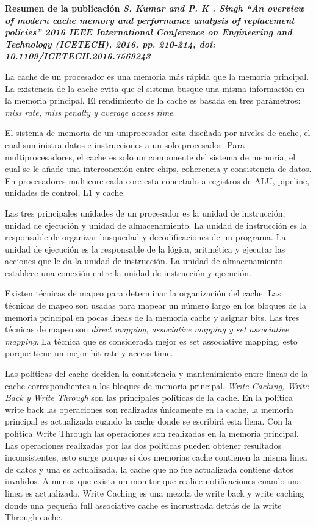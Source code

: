 \item \textbf{Resumen de la publicación \textit{S. Kumar and P. K . Singh ``An overview of modern cache memory and performance analysis of replacement policies'' 2016 IEEE International Conference on Engineering and Technology (ICETECH), 2016, pp. 210-214, doi: 10.1109/ICETECH.2016.7569243}}

La cache de un procesador es una memoria más rápida que la memoria principal. La existencia de la cache evita que el sistema busque una misma información en la memoria principal. El rendimiento de la cache es basada en tres parámetros: \textit{miss rate, miss penalty y average access time}.

El sistema de memoria de un uniprocesador esta diseñada por niveles de cache, el cual suministra datos e instrucciones a un solo procesador. Para multiprocesadores, el cache es solo un componente del sistema de memoria, el cual se le añade una interconexión entre chips, coherencia y consistencia de datos. En procesadores multicore cada core esta conectado a registros de ALU, pipeline, unidades de control, L1 y cache.

Las tres principales unidades de un procesador es la unidad de instrucción, unidad de ejecución y unidad de almacenamiento. La unidad de instrucción es la responsable de organizar busquedad y decodificaciones de un programa. La unidad de ejecución es la responsable de la lógica, aritmética y ejecutar las acciones que le da la unidad de instrucción. La unidad de almacenamiento establece una conexión entre la unidad de instrucción y ejecución.

Existen técnicas de mapeo para determinar la organización del cache. Las técnicas de mapeo son usadas para mapear un número largo en los bloques de la memoria principal en pocas lineas de la memoria cache y asignar bits. Las tres técnicas de mapeo son \textit{direct mapping, associative mapping y set associative mapping}. La técnica que es considerada mejor es set associative mapping, esto porque tiene un mejor hit rate y access time.

Las políticas del cache deciden la consistencia y mantenimiento entre lineas de la cache correspondientes a los bloques de memoria principal. \textit{Write Caching, Write Back y Write Through} son las principales políticas de la cache. En la política write back las operaciones son realizadas únicamente en la cache, la memoria principal es actualizada cuando la cache donde se escribirá esta llena. Con la política Write Through las operaciones son realizadas en la memoria principal. Las operaciones realizadas por las dos políticas pueden obtener resultados inconsistentes, esto surge porque si dos memorias cache contienen la misma linea de datos y una es actualizada, la cache que no fue actualizada contiene datos invalidos. A menos que exista un monitor que realice notificaciones cuando una linea es actualizada. Write Caching es una mezcla de write back y write caching donde una pequeña full associative cache es incrustrada detrás de la write Through cache.

